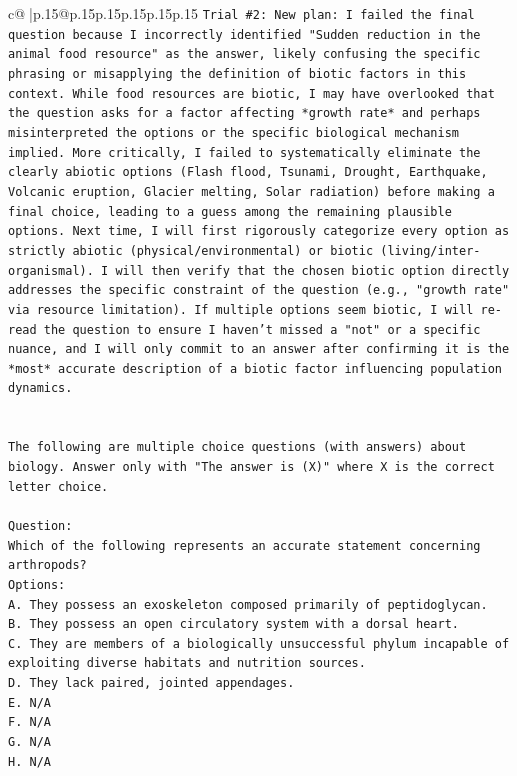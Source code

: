 \documentclass{article}
\begin{document}
{\begin{supertabular}{c@{$\;$}|p{.15\linewidth}@{}p{.15\linewidth}p{.15\linewidth}p{.15\linewidth}p{.15\linewidth}p{.15\linewidth}}
{{{\texttt{Trial \#2: New plan: I failed the final question because I incorrectly identified "Sudden reduction in the animal food resource" as the answer, likely confusing the specific phrasing or misapplying the definition of biotic factors in this context. While food resources are biotic, I may have overlooked that the question asks for a factor affecting *growth rate* and perhaps misinterpreted the options or the specific biological mechanism implied. More critically, I failed to systematically eliminate the clearly abiotic options (Flash flood, Tsunami, Drought, Earthquake, Volcanic eruption, Glacier melting, Solar radiation) before making a final choice, leading to a guess among the remaining plausible options. Next time, I will first rigorously categorize every option as strictly abiotic (physical/environmental) or biotic (living/inter{-}organismal). I will then verify that the chosen biotic option directly addresses the specific constraint of the question (e.g., "growth rate" via resource limitation). If multiple options seem biotic, I will re{-}read the question to ensure I haven't missed a "not" or a specific nuance, and I will only commit to an answer after confirming it is the *most* accurate description of a biotic factor influencing population dynamics.} \\
\\ 
\\ 
\texttt{The following are multiple choice questions (with answers) about biology. Answer only with "The answer is (X)" where X is the correct letter choice.} \\
\\ 
\texttt{Question:} \\
\texttt{Which of the following represents an accurate statement concerning arthropods?} \\
\texttt{Options:} \\
\texttt{A. They possess an exoskeleton composed primarily of peptidoglycan.} \\
\texttt{B. They possess an open circulatory system with a dorsal heart.} \\
\texttt{C. They are members of a biologically unsuccessful phylum incapable of exploiting diverse habitats and nutrition sources.} \\
\texttt{D. They lack paired, jointed appendages.} \\
\texttt{E. N/A} \\
\texttt{F. N/A} \\
\texttt{G. N/A} \\
\texttt{H. N/A} \\
}}}
\end{supertabular}}
\end{document}
